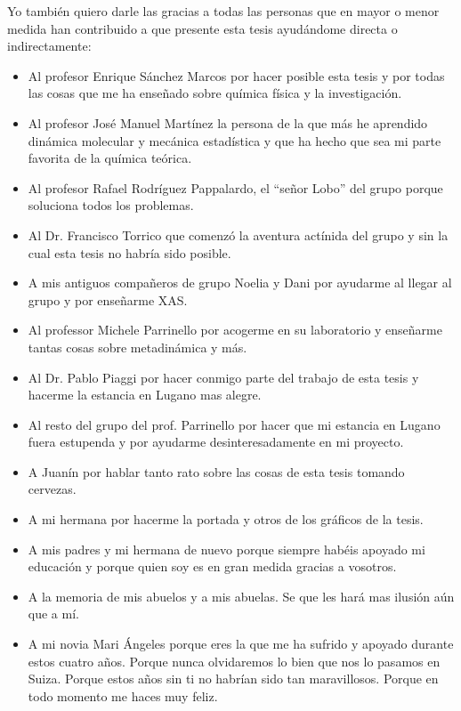 Yo también quiero darle las gracias a todas las personas que en mayor o menor medida han 
contribuido a que presente esta tesis ayudándome directa o indirectamente:
\begin{itemize}
 \item Al profesor Enrique Sánchez Marcos por hacer posible esta tesis y por todas las cosas que me 
ha enseñado sobre química física y la investigación. 
 \item Al profesor José Manuel Martínez la persona de la que más he aprendido dinámica molecular y 
mecánica estadística y que ha hecho que sea mi parte favorita de la química teórica.
 \item Al profesor Rafael Rodríguez Pappalardo, el ``señor Lobo'' del grupo porque soluciona 
todos los problemas.
 \item Al Dr. Francisco Torrico que comenzó la aventura actínida del grupo y sin la cual esta 
tesis no habría sido posible.
 \item A mis antiguos compañeros de grupo Noelia y Dani por ayudarme al llegar al grupo y por 
enseñarme XAS. 
 \item Al professor Michele Parrinello por acogerme en su laboratorio y enseñarme 
tantas cosas sobre metadinámica y más.
 \item Al Dr. Pablo Piaggi por hacer conmigo parte del trabajo de esta tesis y hacerme la estancia 
en Lugano mas alegre.
 \item Al resto del grupo del prof. Parrinello por hacer que mi estancia en Lugano fuera estupenda 
y por ayudarme desinteresadamente en mi proyecto. 
 \item A Juanín por hablar tanto rato sobre las cosas de esta tesis tomando cervezas.
 \item A mi hermana por hacerme la portada y otros de los gráficos de la tesis.
 \item A mis padres y mi hermana de nuevo porque siempre habéis apoyado mi educación y porque 
quien soy es en gran medida gracias a vosotros.
 \item A la memoria de mis abuelos y a mis abuelas. Se que les hará mas ilusión aún que a mí.
 \item A mi novia Mari Ángeles porque eres la que me ha sufrido y apoyado durante estos cuatro 
años. Porque nunca olvidaremos lo bien que nos lo pasamos en Suiza. Porque estos años sin ti no 
habrían sido tan maravillosos. Porque en todo momento me haces muy feliz.
\end{itemize}

